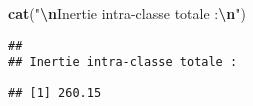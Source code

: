 \documentclass[
]{article}
\newenvironment{Shaded}{\begin{snugshade}}{\end{snugshade}}
\newcommand{\DecValTok}[1]{\textcolor[rgb]{0.00,0.00,0.81}{#1}}
\newcommand{\FunctionTok}[1]{\textcolor[rgb]{0.13,0.29,0.53}{\textbf{#1}}}
\newcommand{\NormalTok}[1]{#1}
\newcommand{\SpecialCharTok}[1]{\textcolor[rgb]{0.81,0.36,0.00}{\textbf{#1}}}
\newcommand{\StringTok}[1]{\textcolor[rgb]{0.31,0.60,0.02}{#1}}
\begin{document}
\begin{Shaded}
\begin{Highlighting}[]
\FunctionTok{cat}\NormalTok{(}\StringTok{"}\SpecialCharTok{\textbackslash{}n}\StringTok{Inertie intra{-}classe totale :}\SpecialCharTok{\textbackslash{}n}\StringTok{"}\NormalTok{)}
\end{Highlighting}
\end{Shaded}

\begin{verbatim}
## 
## Inertie intra-classe totale :
\end{verbatim}

\begin{Shaded}
\end{Shaded}

\begin{verbatim}
## [1] 260.15
\end{verbatim}
\end{document}
